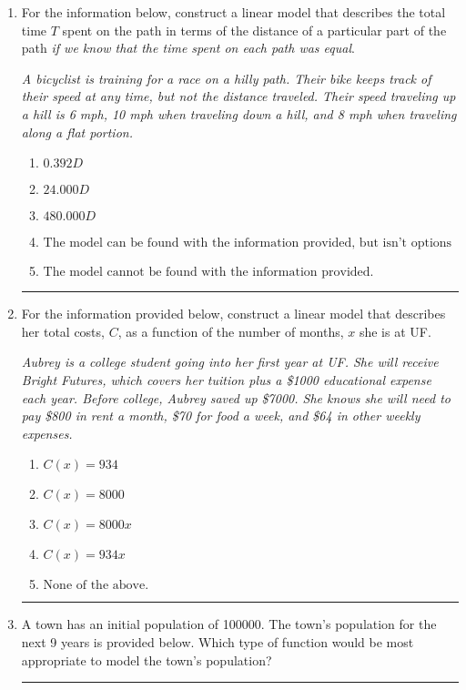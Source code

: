 \documentclass[14pt]{extbook}
\newcommand{\litem}[1]{\item#1\hspace*{-1cm}\rule{\textwidth}{0.4pt}}
\begin{document}
\begin{enumerate}
{\begin{enumerate}[label=\Alph*.]
\end{enumerate} }
\litem{
For the information below, construct a linear model that describes the total time $T$ spent on the path in terms of the distance of a particular part of the path \textit{if we know that the time spent on each path was equal}.
\begin{center}
    \textit{ A bicyclist is training for a race on a hilly path. Their bike keeps track of their speed at any time, but not the distance traveled. Their speed traveling up a hill is 6 mph, 10 mph when traveling down a hill, and 8 mph when traveling along a flat portion. }
\end{center}
\begin{enumerate}[label=\Alph*.]
\item \( 0.392 D \)
\item \( 24.000 D \)
\item \( 480.000 D \)
\item \( \text{The model can be found with the information provided, but isn't options 1-3.} \)
\item \( \text{The model cannot be found with the information provided.} \)

\end{enumerate} }
\litem{
For the information provided below, construct a linear model that describes her total costs, $C$, as a function of the number of months, $x$ she is at UF. 
\begin{center}
    \textit{ Aubrey is a college student going into her first year at UF. She will receive Bright Futures, which covers her tuition plus a \$1000 educational expense each year. Before college, Aubrey saved up \$7000. She knows she will need to pay \$800 in rent a month, \$70 for food a week, and \$64 in other weekly expenses. }
\end{center}
\begin{enumerate}[label=\Alph*.]
\item \( C(x) = 934 \)
\item \( C(x) = 8000 \)
\item \( C(x) = 8000 x \)
\item \( C(x) = 934 x \)
\item \( \text{None of the above.} \)

\end{enumerate} }
\litem{
A town has an initial population of 100000. The town's population for the next 9 years is provided below. Which type of function would be most appropriate to model the town's population?

}
\end{enumerate}
\end{document}
